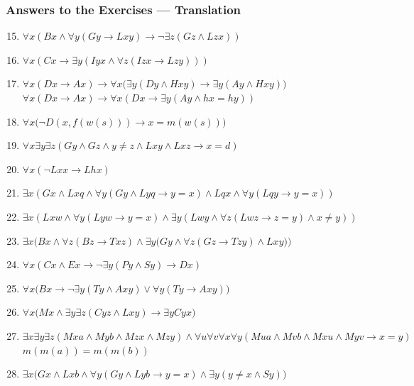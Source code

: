 \documentclass[UTF8,11pt,colorlinks,aspectratio=43]{beamer}%
\begin{document}
\begin{frame}\frametitle{Answers to the Exercises --- Translation}
\begin{enumerate}\setcounter{enumi}{14}
 \item $\forall x(Bx\wedge\forall y(Gy\to Lxy)\to\neg\exists z(Gz\wedge Lzx))$
 \item $\forall x(Cx\to\exists y(Iyx\wedge\forall z(Izx\to Lzy)))$
 \item $\forall x(Dx\to Ax)\to\forall x\big(\exists y(Dy\wedge Hxy)\to\exists y(Ay\wedge Hxy)\big)$\\
 $\forall x(Dx\to Ax)\to\forall x(Dx\to\exists y(Ay\wedge hx=hy))$
 \item $\forall x\big(\neg D(x,f(w(s)))\to x=m(w(s))\big)$
 \item $\forall x\exists y\exists z(Gy\wedge Gz\wedge y\ne z\wedge Lxy\wedge Lxz\to x=d)$
 \item $\forall x(\neg Lxx\to Lhx)$
 \item $\exists x(Gx\wedge Lxq\wedge\forall y(Gy\wedge Lyq\to y=x)\wedge Lqx\wedge \forall y(Lqy\to y=x))$
 \item $\exists x(Lxw\wedge\forall y(Lyw\to y=x)\wedge\exists y(Lwy\wedge\forall z(Lwz\to z=y)\wedge x\ne y))$
 \item $\exists x\Big(Bx\wedge \forall z(Bz\to Txz)\wedge \exists y\big(Gy\wedge\forall z(Gz\to Tzy)\wedge Lxy\big)\Big)$
 \item $\forall x(Cx\wedge Ex\to\neg\exists y(Py\wedge Sy)\to Dx)$
 \item $\forall x\big(Bx\to \neg\exists y(Ty\wedge Axy)\vee \forall y(Ty\to Axy)\big)$
 \item $\forall x\Big(Mx\wedge \exists y\exists z(Cyz\wedge Lxy)\to\exists yCyx\Big)$
 \item $\exists x\exists y\exists z(Mxa\wedge Myb\wedge Mzx\wedge Mzy)\wedge\forall u\forall v\forall x\forall y(Mua\wedge Mvb\wedge Mxu\wedge Myv\to x=y)$\hfill $m(m(a))=m(m(b))$
 \item $\exists x\big(Gx\wedge Lxb\wedge\forall y(Gy\wedge Lyb\to y=x)\wedge\exists y(y\ne x\wedge Sy)\big)$
\end{enumerate}
\end{frame}
\end{document}

